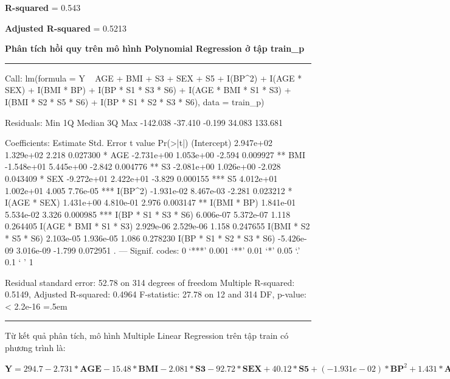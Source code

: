 \documentclass[runningheads]{llncs}
\newenvironment{lcverbatim}
 {\SaveVerbatim{cverb}}
 {\endSaveVerbatim
  \flushleft\fboxrule=0pt\fboxsep=.5em
  \colorbox{cverbbg}{%
    \makebox[\dimexpr\linewidth-2\fboxsep][l]{\BUseVerbatim{cverb}}%
  }
  \endflushleft
}
\begin{document}
\textbf{R-squared} = 0.543

\textbf{Adjusted R-squared} = 0.5213

\vspace{0.5cm}
\textbf{Phân tích hồi quy trên mô hình Polynomial Regression ở tập train\_p}
\vspace{0.5cm}
\hrule
\begin{lcverbatim}
Call:
lm(formula = Y ~ AGE + BMI + S3 + SEX + S5 + I(BP^2) + I(AGE * 
    SEX) + I(BMI * BP) + I(BP * S1 * S3 * S6) + I(AGE * BMI * 
    S1 * S3) + I(BMI * S2 * S5 * S6) + I(BP * S1 * S2 * S3 * 
    S6), data = train_p)

Residuals:
     Min       1Q   Median       3Q      Max 
-142.038  -37.410   -0.199   34.083  133.681 

Coefficients:
                            Estimate Std. Error t value Pr(>|t|)    
(Intercept)                2.947e+02  1.329e+02   2.218 0.027300 *  
AGE                       -2.731e+00  1.053e+00  -2.594 0.009927 ** 
BMI                       -1.548e+01  5.445e+00  -2.842 0.004776 ** 
S3                        -2.081e+00  1.026e+00  -2.028 0.043409 *  
SEX                       -9.272e+01  2.422e+01  -3.829 0.000155 ***
S5                         4.012e+01  1.002e+01   4.005 7.76e-05 ***
I(BP^2)                   -1.931e-02  8.467e-03  -2.281 0.023212 *  
I(AGE * SEX)               1.431e+00  4.810e-01   2.976 0.003147 ** 
I(BMI * BP)                1.841e-01  5.534e-02   3.326 0.000985 ***
I(BP * S1 * S3 * S6)       6.006e-07  5.372e-07   1.118 0.264405    
I(AGE * BMI * S1 * S3)     2.929e-06  2.529e-06   1.158 0.247655    
I(BMI * S2 * S5 * S6)      2.103e-05  1.936e-05   1.086 0.278230    
I(BP * S1 * S2 * S3 * S6) -5.426e-09  3.016e-09  -1.799 0.072951 .  
---
Signif. codes:  0 ‘***’ 0.001 ‘**’ 0.01 ‘*’ 0.05 ‘.’ 0.1 ‘ ’ 1

Residual standard error: 52.78 on 314 degrees of freedom
Multiple R-squared:  0.5149,	Adjusted R-squared:  0.4964 
F-statistic: 27.78 on 12 and 314 DF,  p-value: < 2.2e-16
\end{lcverbatim}
\hrule
\vspace{0.5cm}

Từ kết quả phân tích, mô hình Multiple Linear Regression trên tập train có phương trình là:
\begin{center}
	$\textbf{Y}=  294.7-2.731* \textbf{AGE} -15.48*\textbf{BMI} -  2.081*\textbf{S3} -
	92.72*\textbf{SEX} +40.12*\textbf{S5} +(-1.931e-02)*\textbf{BP}^2+1.431*\textbf{AGE*SEX}+(1.841e-01)*\textbf{BM*BP}+(6.006e-07)*\textbf{BP*S1*S3*S6}+(2.929e-06)*\textbf{AGE*BMI*S1*S3}+(2.103e-05)*\textbf{BMI*S2*S5*S6}+(-5.426e-09)*\textbf{BP*S1*S2*S3*S6}$
\end{center}
\end{document}
